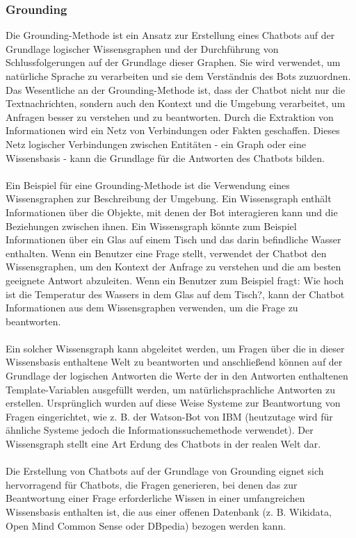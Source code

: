 \subsubsection{Grounding}
Die Grounding-Methode ist ein Ansatz zur Erstellung eines Chatbots auf der Grundlage logischer Wissensgraphen und der Durchführung von Schlussfolgerungen auf der Grundlage dieser Graphen. 
Sie wird verwendet, um natürliche Sprache zu verarbeiten und sie dem Verständnis des Bots zuzuordnen. Das Wesentliche an der Grounding-Methode ist, dass der Chatbot nicht nur die Textnachrichten, sondern auch den Kontext und die Umgebung verarbeitet, um Anfragen besser zu verstehen und zu beantworten. 
Durch die Extraktion von Informationen wird ein Netz von Verbindungen oder Fakten geschaffen. Dieses Netz logischer Verbindungen zwischen Entitäten - ein Graph oder eine Wissensbasis - kann die Grundlage für die Antworten des Chatbots bilden.\\\\
Ein Beispiel für eine Grounding-Methode ist die Verwendung eines Wissensgraphen zur Beschreibung der Umgebung. 
Ein Wissensgraph enthält Informationen über die Objekte, mit denen der Bot interagieren kann und die Beziehungen zwischen ihnen. 
Ein Wissensgraph könnte zum Beispiel Informationen über ein Glas auf einem Tisch und das darin befindliche Wasser enthalten. 
Wenn ein Benutzer eine Frage stellt, verwendet der Chatbot den Wissensgraphen, um den Kontext der Anfrage zu verstehen und die am besten geeignete Antwort abzuleiten. 
Wenn ein Benutzer zum Beispiel fragt: \glqq{}Wie hoch ist die Temperatur des Wassers in dem Glas auf dem Tisch?\grqq{}, kann der Chatbot Informationen aus dem Wissensgraphen verwenden, um die Frage zu beantworten.\\\\
Ein solcher Wissensgraph kann abgeleitet werden, um Fragen über die in dieser Wissensbasis enthaltene Welt zu beantworten und anschließend können auf der Grundlage der logischen Antworten die Werte der in den Antworten enthaltenen Template-Variablen ausgefüllt werden, um natürlichsprachliche Antworten zu erstellen. 
Ursprünglich wurden auf diese Weise Systeme zur Beantwortung von Fragen eingerichtet, wie z. B. der Watson-Bot von IBM (heutzutage wird für ähnliche Systeme jedoch die Informationssuchemethode verwendet). 
Der Wissensgraph stellt eine Art \glqq{}Erdung\grqq{} des Chatbots in der realen Welt dar.\\\\
Die Erstellung von Chatbots auf der Grundlage von \glqq{}Grounding\grqq{} eignet sich hervorragend für Chatbots, die Fragen generieren, bei denen das zur Beantwortung einer Frage erforderliche Wissen in einer umfangreichen Wissensbasis enthalten ist, die aus einer offenen Datenbank (z. B. Wikidata, Open Mind Common Sense oder DBpedia) bezogen werden kann.\\\\
